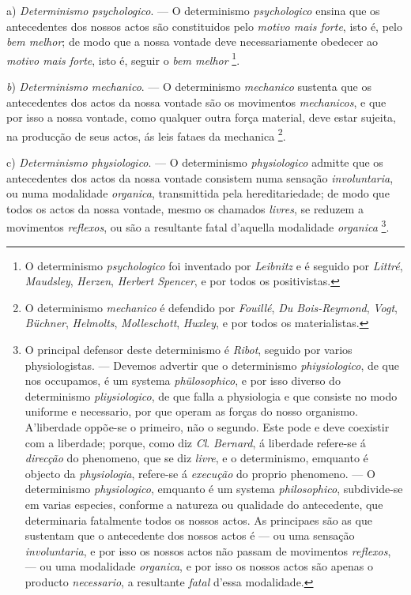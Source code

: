 a) \emph{Determinismo psychologico}. --- O determinismo \emph{psychologico} ensina que os antecedentes dos nossos actos são constituidos pelo \emph{motivo mais forte}, isto é, pelo \emph{bem melhor}; de modo que a nossa vontade deve necessariamente obedecer ao \emph{motivo mais forte}, isto é, seguir o \emph{bem melhor} \footnote{O determinismo \emph{psychologico} foi inventado por \emph{Leibnitz} e é seguido por \emph{Littré}, \emph{Maudsley}, \emph{Herzen}, \emph{Herbert Spencer}, e por todos os positivistas.}.

\emph{b}) \emph{Determinismo mechanico}. --- O determinismo \emph{mechanico} sustenta que os antecedentes dos actos da nossa vontade são os movimentos \emph{mechanicos}, e que por isso a nossa vontade, como qualquer outra força material, deve estar sujeita, na producção de seus actos, ás leis fataes da mechanica \footnote{O determinismo \emph{mechanico} é defendido por \emph{Fouillé}, \emph{Du Bois-Reymond}, \emph{Vogt}, \emph{Büchner}, \emph{Helmolts}, \emph{Molleschott}, \emph{Huxley}, e por todos os materialistas.}.

c) \emph{Determinismo physiologico}. --- O determinismo \emph{physiologico} admitte que os antecedentes dos actos da nossa vontade consistem numa sensação \emph{involuntaria}, ou numa modalidade \emph{organica}, transmittida pela hereditariedade; de modo que todos os actos da nossa vontade, mesmo os chamados \emph{livres}, se reduzem a movimentos \emph{reflexos}, ou são a resultante fatal d'aquella modalidade \emph{organica} \footnote{O principal defensor deste determinismo é \emph{Ribot}, seguido por varios physiologistas. --- Devemos advertir que o determinismo \emph{phiysiologico}, de que nos occupamos, é um systema \emph{phülosophico}, e por isso diverso do determinismo \emph{pliysiologico}, de que falla a physiologia e que consiste no modo uniforme e necessario, por que operam as forças do nosso organismo. A'liberdade oppõe-se o primeiro, não o segundo. Este pode e deve coexistir com a liberdade; porque, como diz \emph{Cl}. \emph{Bernard}, á liberdade refere-se á \emph{direcção} do phenomeno, que se diz \emph{livre}, e o determinismo, emquanto é objecto da \emph{physiologia}, refere-se á \emph{execução} do proprio phenomeno. --- O determinismo \emph{physiologico}, emquanto é um systema \emph{philosophico}, subdivide-se em varias especies, conforme a natureza ou qualidade do antecedente, que determinaria fatalmente todos os nossos actos. As principaes são as que sustentam que o antecedente dos nossos actos é --- ou uma sensação \emph{involuntaria}, e por isso os nossos actos não passam de movimentos \emph{reflexos}, --- ou uma modalidade \emph{organica}, e por isso os nossos actos são apenas o producto \emph{necessario}, a resultante \emph{fatal} d'essa modalidade.}.

